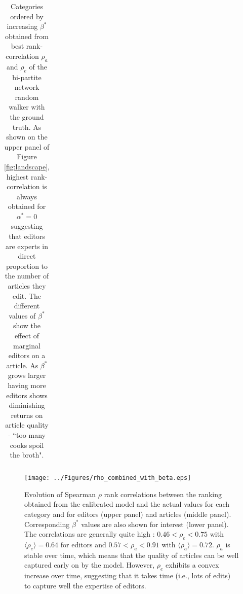 \begin{table}
\begin{tabular}{|llcccc|}
\hline
\end{tabular}
\caption{Categories ordered by increasing $\beta^{*}$ obtained from best rank-correlation $\rho_a$ and  $\rho_e$
 of the {bi-partite network random walker} with the ground truth. As shown on the upper panel of Figure \ref{fig:landscape}, highest rank-correlation is always obtained for $\alpha^{*} = 0$ suggesting that editors are experts in direct proportion to the number of articles they edit. The different values of $\beta^{*}$ show the effect of marginal editors on a article. As $\beta^{*}$ grows larger having more editors shows diminishing returns on article quality - ``too many cooks spoil the broth".}
\label{tab:maxbeta}
\end{table}










\begin{figure}[!t]
\centering
\texttt{[image: ../Figures/rho\_combined\_with\_beta.eps]}
\caption{Evolution of Spearman $\rho$ rank correlations between the ranking obtained from the calibrated model and the actual values for each category and for editors (upper panel)  and articles (middle panel). Corresponding $\beta^{*}$ values are also shown for interest (lower panel). The correlations are generally quite high : $ 0.46 < \rho_e < 0.75$ with $\langle \rho_e\rangle = 0.64$ for editors and $0.57 < \rho_a < 0.91$ with $\langle \rho_a\rangle = 0.72$. $\rho_{a}$  is stable over time, which means that the quality of articles can be well captured early on by the model. However, $\rho_e$ exhibits a convex increase over time, suggesting that it takes time (i.e., lots of edits) to capture well the expertise of editors.}
\label{fig:rhotime}


\end{figure}

	


